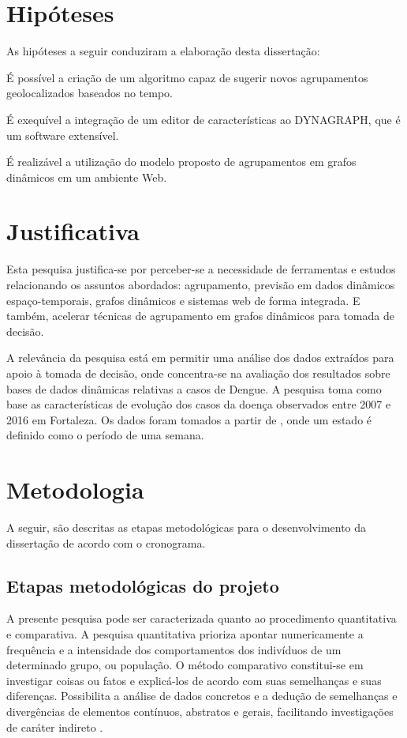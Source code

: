 \section{Hipóteses}
As hipóteses a seguir conduziram a elaboração desta dissertação:
\begin{alineas}
	\item É possível a criação de um algoritmo capaz de sugerir novos agrupamentos geolocalizados baseados no tempo.
	\item É exequível a integração de um editor de características ao DYNAGRAPH, que é um software extensível.
	\item É realizável a utilização do modelo proposto de agrupamentos em grafos dinâmicos em um ambiente Web.
\end{alineas}

\section{Justificativa}
Esta pesquisa justifica-se por perceber-se a necessidade de ferramentas e estudos 
relacionando os assuntos abordados: agrupamento, previsão em dados
dinâmicos espaço-temporais, grafos dinâmicos e sistemas web de forma integrada.
E também, acelerar técnicas de agrupamento em grafos dinâmicos para tomada de decisão.

A relevância da pesquisa está em permitir uma análise dos dados extraídos 
para apoio à tomada de decisão, onde concentra-se na avaliação dos resultados sobre bases de dados
dinâmicas relativas a casos de Dengue.
A pesquisa toma como base as características de evolução dos casos da doença
observados entre 2007 e 2016 em Fortaleza.
Os dados foram tomados a partir de \cite{simda}, onde um estado é definido como o período de uma semana. 

\section{Metodologia}
A seguir, são descritas as etapas metodológicas para o desenvolvimento da dissertação de acordo com o cronograma.

\subsection{Etapas metodológicas do projeto}
A presente pesquisa pode ser caracterizada quanto ao procedimento quantitativa
e comparativa. A pesquisa quantitativa prioriza apontar numericamente a frequência e a
intensidade dos comportamentos dos indivíduos de um determinado grupo, ou população. O
método comparativo constitui-se em investigar coisas ou fatos e explicá-los de acordo com
suas semelhanças e suas diferenças. Possibilita a análise de dados concretos e a dedução de
semelhanças e divergências de elementos contínuos, abstratos e gerais, facilitando investigações
de caráter indireto \cite{fachin}.

